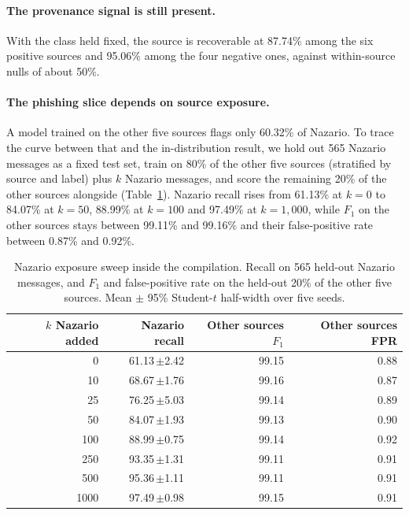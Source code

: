 \documentclass[twoside,11pt]{article}
\begin{document}
\paragraph{The provenance signal is still present.} With the class held
fixed, the source is recoverable at 87.74\% among the six positive sources
and 95.06\% among the four negative ones, against within-source nulls of
about 50\%.

\paragraph{The phishing slice depends on source exposure.} A model trained
on the other five sources flags only 60.32\% of Nazario. To trace the curve
between that and the in-distribution result, we hold out 565 Nazario messages
as a fixed test set, train on 80\% of the other five sources (stratified by
source and label) plus $k$ Nazario messages, and score the remaining 20\% of
the other sources alongside (Table~\ref{tab:nazsweep}). Nazario recall rises
from 61.13\% at $k=0$ to 84.07\% at $k=50$, 88.99\% at $k=100$ and 97.49\% at
$k=1{,}000$, while $F_1$ on the other sources stays between 99.11\% and
99.16\% and their false-positive rate between 0.87\% and 0.92\%.

\begin{table}[t]
\centering\small
\caption{Nazario exposure sweep inside the compilation. Recall on 565
held-out Nazario messages, and $F_1$ and false-positive rate on the held-out
20\% of the other five sources. Mean $\pm$ 95\% Student-$t$ half-width over
five seeds.}
\label{tab:nazsweep}
\begin{tabular}{rrrr}
\toprule
$k$ Nazario added & Nazario recall & Other sources $F_1$ & Other sources FPR \\
\midrule
0    & 61.13\,$\pm$2.42 & 99.15 & 0.88 \\
10   & 68.67\,$\pm$1.76 & 99.16 & 0.87 \\
25   & 76.25\,$\pm$5.03 & 99.14 & 0.89 \\
50   & 84.07\,$\pm$1.93 & 99.13 & 0.90 \\
100  & 88.99\,$\pm$0.75 & 99.14 & 0.92 \\
250  & 93.35\,$\pm$1.31 & 99.11 & 0.91 \\
500  & 95.36\,$\pm$1.11 & 99.11 & 0.91 \\
1000 & 97.49\,$\pm$0.98 & 99.15 & 0.91 \\
\bottomrule
\end{tabular}
\end{table}
\end{document}
